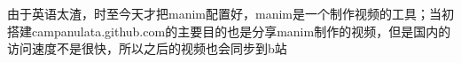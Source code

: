 \documentclass[preview]{standalone}
\begin{document}
\centering 由于英语太渣，时至今天才把manim配置好，manim是一个制作视频的工具；当初搭建campanulata.github.com的主要目的也是分享manim制作的视频，但是国内的访问速度不是很快，所以之后的视频也会同步到b站
\end{document}
